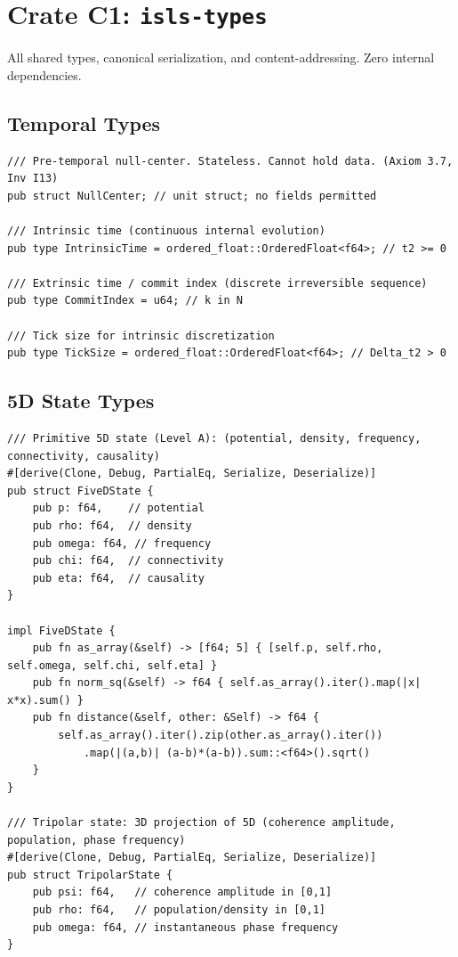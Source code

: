 \documentclass[10pt,a4paper]{article}
\theoremstyle{definition}\newtheorem{definition}{Def}[section]
\theoremstyle{plain}\newtheorem{theorem}{Thm}[section]
\newcommand{\crate}[1]{\texttt{\small\color{rustborder!80!black}#1}}
\begin{document}
\section{Crate C1: \crate{isls-types}}
\label{sec:c1}

All shared types, canonical serialization, and content-addressing. Zero internal dependencies.

\subsection{Temporal Types}

\begin{lstlisting}[style=rust]
/// Pre-temporal null-center. Stateless. Cannot hold data. (Axiom 3.7, Inv I13)
pub struct NullCenter; // unit struct; no fields permitted

/// Intrinsic time (continuous internal evolution)
pub type IntrinsicTime = ordered_float::OrderedFloat<f64>; // t2 >= 0

/// Extrinsic time / commit index (discrete irreversible sequence)
pub type CommitIndex = u64; // k in N

/// Tick size for intrinsic discretization
pub type TickSize = ordered_float::OrderedFloat<f64>; // Delta_t2 > 0
\end{lstlisting}

\subsection{5D State Types}

\begin{lstlisting}[style=rust]
/// Primitive 5D state (Level A): (potential, density, frequency, connectivity, causality)
#[derive(Clone, Debug, PartialEq, Serialize, Deserialize)]
pub struct FiveDState {
    pub p: f64,    // potential
    pub rho: f64,  // density
    pub omega: f64, // frequency
    pub chi: f64,  // connectivity
    pub eta: f64,  // causality
}

impl FiveDState {
    pub fn as_array(&self) -> [f64; 5] { [self.p, self.rho, self.omega, self.chi, self.eta] }
    pub fn norm_sq(&self) -> f64 { self.as_array().iter().map(|x| x*x).sum() }
    pub fn distance(&self, other: &Self) -> f64 {
        self.as_array().iter().zip(other.as_array().iter())
            .map(|(a,b)| (a-b)*(a-b)).sum::<f64>().sqrt()
    }
}

/// Tripolar state: 3D projection of 5D (coherence amplitude, population, phase frequency)
#[derive(Clone, Debug, PartialEq, Serialize, Deserialize)]
pub struct TripolarState {
    pub psi: f64,   // coherence amplitude in [0,1]
    pub rho: f64,   // population/density in [0,1]
    pub omega: f64, // instantaneous phase frequency
}
\end{lstlisting}
\end{document}
